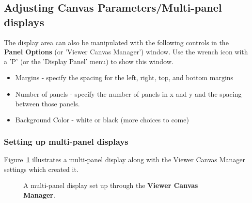 
% 

\subsection{Adjusting Canvas Parameters/Multi-panel displays}
\label{section:display.viewerGUI.canvas}

The display area can also be manipulated with the following controls in
the {\bf Panel Options} (or 'Viewer Canvas Manager') window.
Use the wrench icon with a 'P' (or the 'Display Panel' menu) to show this
window.
\begin{itemize}
   \item Margins - specify the spacing for the left, right, top, and bottom margins
   \item Number of panels - specify the number of panels in x and y
         and the spacing between those panels.
   \item Background Color - white or black (more choices to come)
\end{itemize}

\subsubsection{Setting up multi-panel displays}
\label{section:display.viewerGUI.canvas.multi}

Figure~\ref{fig:viewer_canvas} illustrates a multi-panel display along
with the Viewer Canvas Manager settings which created it. 

\begin{figure}[h!]
\begin{center}
\caption{\label{fig:viewer_canvas} A multi-panel display
set up through the {\bf Viewer Canvas Manager}.} 
\hrulefill
\end{center}
\end{figure}

